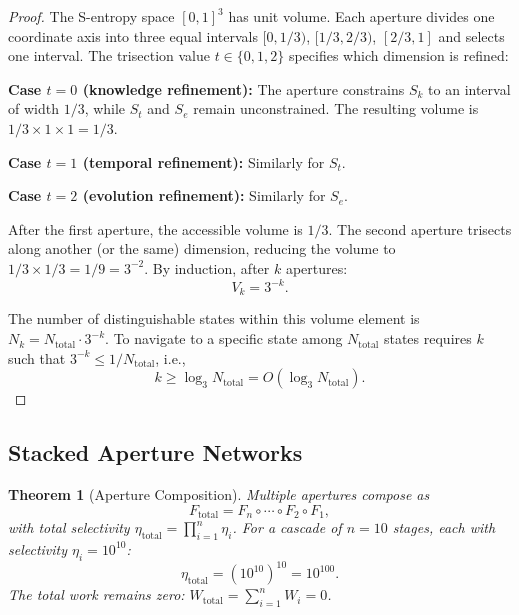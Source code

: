 \documentclass[twocolumn,10pt]{article}
\newtheorem{theorem}{Theorem}[section]
\theoremstyle{remark}
\newcommand{\Sk}{S_k}
\newcommand{\St}{S_t}
\newcommand{\Se}{S_e}
\begin{document}
\begin{proof}
The S-entropy space $[0,1]^3$ has unit volume. Each aperture divides one coordinate axis into three equal intervals $[0, 1/3)$, $[1/3, 2/3)$, $[2/3, 1]$ and selects one interval. The trisection value $t \in \{0, 1, 2\}$ specifies which dimension is refined:

\textbf{Case $t = 0$ (knowledge refinement):} The aperture constrains $\Sk$ to an interval of width $1/3$, while $\St$ and $\Se$ remain unconstrained. The resulting volume is $1/3 \times 1 \times 1 = 1/3$.

\textbf{Case $t = 1$ (temporal refinement):} Similarly for $\St$.

\textbf{Case $t = 2$ (evolution refinement):} Similarly for $\Se$.

After the first aperture, the accessible volume is $1/3$. The second aperture trisects along another (or the same) dimension, reducing the volume to $1/3 \times 1/3 = 1/9 = 3^{-2}$. By induction, after $k$ apertures:
\begin{equation}
V_k = 3^{-k}.
\end{equation}

The number of distinguishable states within this volume element is $N_k = N_{\mathrm{total}} \cdot 3^{-k}$. To navigate to a specific state among $N_{\mathrm{total}}$ states requires $k$ such that $3^{-k} \leq 1/N_{\mathrm{total}}$, i.e.,
\begin{equation}
k \geq \log_3 N_{\mathrm{total}} = O(\log_3 N_{\mathrm{total}}).
\end{equation}
\end{proof}

\subsection{Stacked Aperture Networks}

\begin{theorem}[Aperture Composition]
\label{thm:aperture_compose}
Multiple apertures compose as
\begin{equation}
F_{\mathrm{total}} = F_n \circ \cdots \circ F_2 \circ F_1,
\label{eq:compose}
\end{equation}
with total selectivity $\eta_{\mathrm{total}} = \prod_{i=1}^n \eta_i$. For a cascade of $n = 10$ stages, each with selectivity $\eta_i = 10^{10}$:
\begin{equation}
\eta_{\mathrm{total}} = (10^{10})^{10} = 10^{100}.
\label{eq:selectivity}
\end{equation}
The total work remains zero: $W_{\mathrm{total}} = \sum_{i=1}^n W_i = 0$.
\end{theorem}
\end{document}
